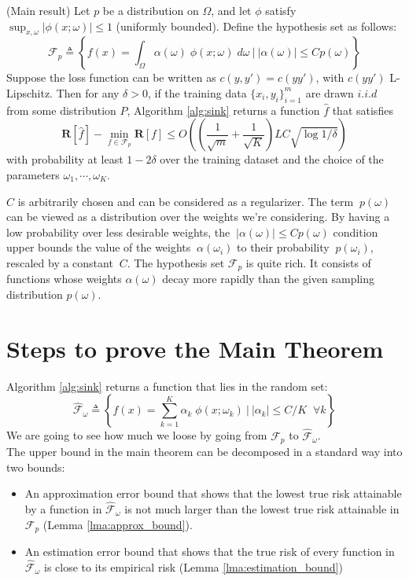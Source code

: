 \documentclass{article}
\begin{document}
\begin{thm}(Main result)
    Let $p$ be a distribution on $\Omega$, and let $\phi$ satisfy $\sup_{x,\omega} |\phi(x; \omega)| \leq 1$ (uniformly bounded).
    Define the hypothesis set as follows:
    \begin{equation}
        \mathcal{F}_p \triangleq
        \left\{f(x) = \int_\Omega \alpha(\omega)\;\phi(x; \omega) \;d\omega ~\Big|~
        |\alpha(\omega)| \leq C p(\omega) \right\}
    \end{equation}
    Suppose the loss function can be written as $c(y, y')= c(yy')$,  with $c(yy')$ L-Lipschitz. Then for any $\delta > 0$, if the training data $\{x_i, y_i\}_{i=1}^m$ are drawn $i.i.d$ from some distribution $P$, Algorithm \ref{alg:sink} returns a function $\hat{f}$ that satisfies
    \begin{equation*}
        \mathbf{R}[\hat{f}] - \min_{f\in \mathcal{F}_p}\mathbf{R}[f] \leq O \left(\left(\frac{1}{\sqrt{m}} + \frac{1}{\sqrt{K}}\right)LC \sqrt{\log 1/\delta}\right)
    \end{equation*}
    with probability at least $1 - 2\delta$ over the training dataset and the choice of the parameters $\omega_1, \cdots , \omega_K$.
    \label{thm:main}
\end{thm}
$C$ is arbitrarily chosen and can be considered as a regularizer. The term $\ p(\omega)$ can be viewed as a distribution over the weights we're considering. By having a low probability over less desirable weights, the $\ |\alpha(\omega)| \leq C p(\omega)$ condition upper bounds the value of the weights $\ \alpha(\omega_i)$ to their probability $\ p(\omega_i)$, rescaled by a constant $\ C$.
The hypothesis set $\mathcal{F}_p$ is quite rich. It consists of functions whose weights $\alpha(\omega)$ decay more rapidly than the
given sampling distribution $p(\omega)$.

\section{Steps to prove the Main Theorem}
Algorithm \ref{alg:sink} returns a function that lies in the random set:
\[
        \mathcal{\hat{F}}_\omega \triangleq
        \left\{f(x) = \sum_{k=1}^K \alpha_k \; \phi(x; \omega_k) ~\Big|~
        |\alpha_k| \leq C/K \;\;\forall k\right\}
\]
We are going to see how much we loose by going from $\mathcal{F}_p$ to $\mathcal{\hat{F}}_\omega$.\\
The upper bound in the main theorem can be decomposed in a standard way into two bounds:
\begin{itemize}
    \item  An approximation error bound that shows that the lowest true risk attainable by a function
    in $\hat{\mathcal{F}}_\omega$ is not much larger than the lowest true risk attainable in $\mathcal{F}_p$ (Lemma \ref{lma:approx_bound}).

    \item An estimation error bound  that shows that the true risk  of every function in $\hat{\mathcal{F}}_\omega$ is    close to its empirical risk (Lemma \ref{lma:estimation_bound})
\end{itemize}
\end{document}
